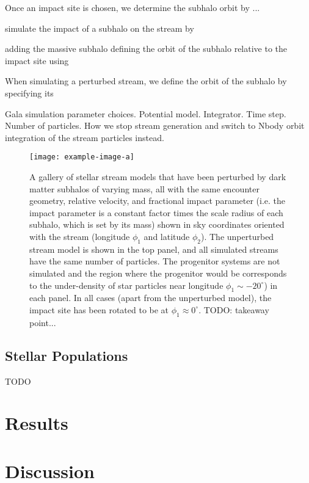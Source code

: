 Once an impact site is chosen, we determine the subhalo orbit by ...

simulate the impact of a subhalo on the stream by

adding the massive subhalo  defining the orbit of the subhalo relative to the impact site using

When simulating a perturbed stream, we define the orbit of the subhalo by specifying its

Gala simulation parameter choices. Potential model. Integrator. Time step. Number of particles. How we stop stream generation and switch to Nbody orbit integration of the stream particles instead.

\begin{figure*}[!t]
\begin{center}
\texttt{[image: example-image-a]} %
\end{center}
\caption{%
A gallery of stellar stream models that have been perturbed by dark matter subhalos of
varying mass, all with the same encounter geometry, relative velocity, and fractional
impact parameter (i.e. the impact parameter is a constant factor times the scale radius
of each subhalo, which is set by its mass) shown in sky coordinates oriented with the
stream (longitude $\phi_1$ and latitude $\phi_2$).
The unperturbed stream model is shown in the top panel, and all simulated streams have
the same number of particles.
The progenitor systems are not simulated and the region where the progenitor would be
corresponds to the under-density of star particles near longitude $\phi_1 \sim
-20^\circ$) in each panel.
In all cases (apart from the unperturbed model), the impact site has been rotated to be
at $\phi_1 \approx 0^\circ$.
TODO: takeaway point...
\label{fig:simgallery}
}
\end{figure*}

\subsection{Stellar Populations} \label{sec:stellarpops}

TODO

\section{Results} \label{sec:results}


\section{Discussion} \label{sec:discussion}


